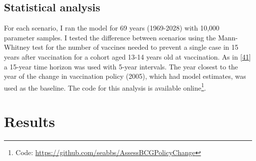 \documentclass[11pt,twoside]{bristolthesis}
\begin{document}
  \hypertarget{statistical-analysis}{%
  \subsection{Statistical analysis}\label{statistical-analysis}}
  
  For each scenario, I ran the model for 69 years (1969-2028) with 10,000 parameter samples. I tested the difference between scenarios using the Mann-Whitney test for the number of vaccines needed to prevent a single case in 15 years after vaccination for a cohort aged 13-14 years old at vaccination. As in {[}\protect\hyperlink{ref-Sutherland1989}{41}{]} a 15-year time horizon was used with 5-year intervals. The year closest to the year of the change in vaccination policy (2005), which had model estimates, was used as the baseline. The code for this analysis is available online\footnote{Code: \url{https://github.com/seabbs/AssessBCGPolicyChange}}.
  
  \hypertarget{results}{%
  \section{Results}\label{results}}
  
\end{document}
